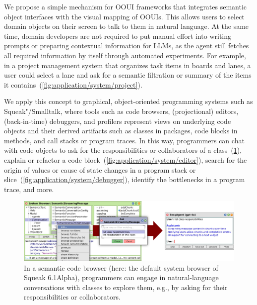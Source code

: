 We propose a simple mechanism for OOUI frameworks that integrates semantic object interfaces with the visual mapping of OOUIs.
This allows users to select domain objects on their screen to talk to them in natural language.
At the same time, domain developers are not required to put manual effort into writing prompts or preparing contextual information for LLMs, as the agent still fetches all required information by itself through automated experiments.
For example, in a project management system that organizes task items in boards and lanes, a user could select a lane and ask for a semantic filtration or summary of the items it contains~(\cref{fig:application/system/project}).

\FloatBarrier

We apply this concept to graphical, object-oriented programming systems such as Squeak"/Smalltalk, where tools such as code browsers, (projectional) editors, (back-in-time) debuggers, and profilers represent views on underlying code objects and their derived artifacts such as classes in packages, code blocks in methods, and call stacks or program traces.
In this way, programmers can chat with code objects to ask for the responsibilities or collaborators of a class~(\cref{fig:application/system/browser}), explain or refactor a code block~(\cref{fig:application/system/editor}), search for the origin of values or cause of state changes in a program stack or slice~(\cref{fig:application/system/debugger}), identify the bottlenecks in a program trace, and more.

\begin{figure}[Z]
	\centering
	\includegraphics[width=\linewidth]{chapters/08_application/03_system/browser.png}
	\caption[In a semantic code browser, programmers can engage in natural-language conversations with classes to explore them, e.g., by asking for their responsibilities or collaborators.]{
		In a semantic code browser (here: the default system browser of Squeak 6.1Alpha), programmers can engage in natural-language conversations with classes to explore them, e.g., by asking for their responsibilities or collaborators.
	}
	\label{fig:application/system/browser}
\end{figure}

